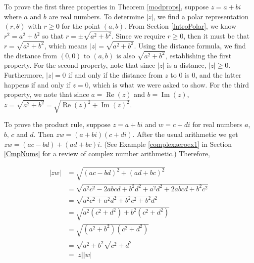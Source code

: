 \smallskip

To prove the first three properties in Theorem \ref{modprops}, suppose $z = a + bi$ where $a$ and $b$ are real numbers.  To determine $|z|$, we find a polar representation $(r,\theta)$ with $r \geq 0$ for the point $(a,b)$.  From Section \ref{IntroPolar}, we know $r^2 = a^2 + b^2$ so that $r = \pm \sqrt{a^2+b^2}$.  Since we require $r \geq 0$, then it must be that $r = \sqrt{a^2 +b^2}$, which means $|z| = \sqrt{a^2+b^2}$.  Using the distance formula, we find the distance from $(0,0)$ to $(a,b)$ is also $\sqrt{a^2+b^2}$, establishing the first property.  For the second property, note that since $|z|$ is a distance, $|z| \geq 0$.  Furthermore,  $|z| = 0$ if and only if the distance from $z$ to $0$ is $0$, and the latter happens if and only if $z = 0$, which is what we were asked to show.  For the third property, we note that since $a = \operatorname{Re}(z)$ and $b = \operatorname{Im}(z)$, $z = \sqrt{a^2+b^2} = \sqrt{\operatorname{Re}(z)^2 + \operatorname{Im}(z)^2}$.





\smallskip

To prove the product rule, suppose $z = a + bi$ and  $w = c + di$ for real numbers $a$, $b$, $c$ and $d$.  Then $zw = (a+bi)(c+di)$.  After the usual arithmetic  we get $zw = (ac-bd) + (ad+bc)i$. (See Example \ref{complexzeroex1} in Section \ref{CmpNums} for a review of complex number arithmetic.) Therefore,

\begin{align*}
|zw| & =  \sqrt{(ac-bd)^2+(ad+bc)^2}  \\
	 & =  \sqrt{a^2c^2 - 2abcd + b^2d^2 + a^2d^2 +2abcd + b^2c^2}  \tag*{Expand} \\
	 & = \sqrt{a^2c^2 + a^2d^2 + b^2c^2 + b^2d^2}  \tag*{Rearrange terms} \\
	 & =  \sqrt{a^2\left(c^2+d^2\right) + b^2\left(c^2+d^2\right)}  \tag*{Factor} \\
	 & =  \sqrt{\left(a^2+b^2\right)\left(c^2+d^2\right)}  \tag*{Factor}\\
	 & = \sqrt{a^2+b^2} \sqrt{c^2+d^2}  \tag*{Product Rule for Radicals} \\
	 & =  |z| |w|  \tag*{Definition of $|z|$ and $|w|$}
\end{align*}
		 
